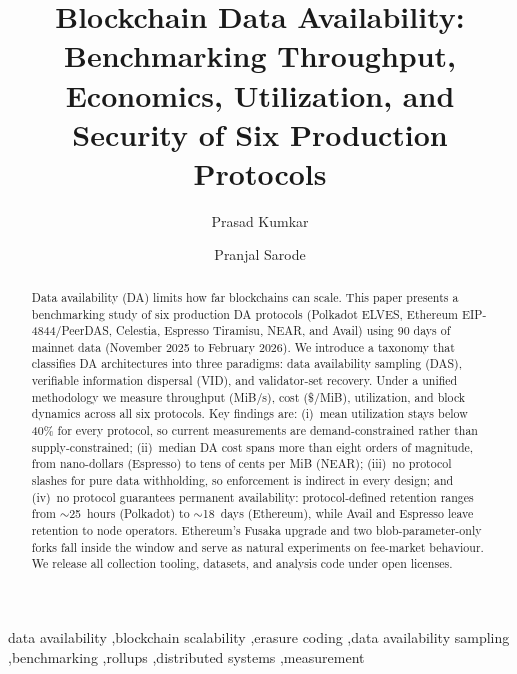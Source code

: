 \documentclass[5p,times,twocolumn,final]{elsarticle}
\begin{document}
\begin{frontmatter}

\title{Blockchain Data Availability: Benchmarking Throughput, Economics, Utilization, and Security of Six Production Protocols}

\author[cs]{Prasad Kumkar}
\author[cs]{Pranjal Sarode}

\begin{abstract}
Data availability (DA) limits how far blockchains can scale.
This paper presents a benchmarking study of six production DA protocols (Polkadot ELVES, Ethereum EIP-4844/PeerDAS, Celestia, Espresso Tiramisu, NEAR, and Avail) using 90 days of mainnet data (November 2025 to February 2026).
We introduce a taxonomy that classifies DA architectures into three paradigms: data availability sampling (DAS), verifiable information dispersal (VID), and validator-set recovery.
Under a unified methodology we measure throughput (MiB/s), cost (\$/MiB), utilization, and block dynamics across all six protocols.
Key findings are: (i)~mean utilization stays below 40\% for every protocol, so current measurements are demand-constrained rather than supply-constrained; (ii)~median DA cost spans more than eight orders of magnitude, from nano-dollars (Espresso) to tens of cents per MiB (NEAR); (iii)~no protocol slashes for pure data withholding, so enforcement is indirect in every design; and (iv)~no protocol guarantees permanent availability: protocol-defined retention ranges from $\sim$25~hours (Polkadot) to $\sim$18~days (Ethereum), while Avail and Espresso leave retention to node operators.
Ethereum's Fusaka upgrade and two blob-parameter-only forks fall inside the window and serve as natural experiments on fee-market behaviour.
We release all collection tooling, datasets, and analysis code under open licenses.
\end{abstract}

\begin{keyword}
data availability \sep blockchain scalability \sep erasure coding \sep data availability sampling \sep benchmarking \sep rollups \sep distributed systems \sep measurement
\end{keyword}

\end{frontmatter}
\end{document}
